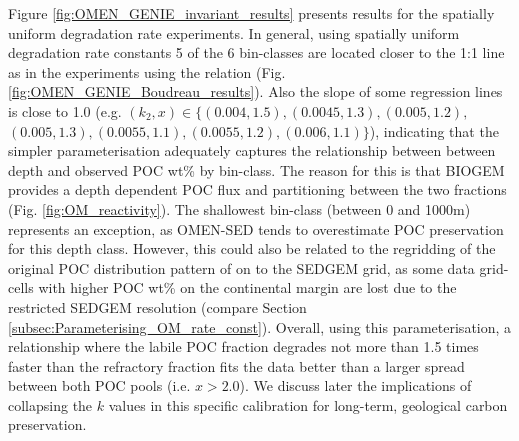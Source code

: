 \documentclass[gmd, manuscript]{copernicus}
\begin{document}
Figure \ref{fig:OMEN_GENIE_invariant_results} presents results for the spatially uniform degradation rate experiments. 
In general, using spatially uniform degradation rate constants 5 of the 6 bin-classes are located closer to the 1:1 line as in the experiments using the \citet{boudreau1997diagenetic} relation (Fig. \ref{fig:OMEN_GENIE_Boudreau_results}). 
Also the slope of some regression lines is close to 1.0 (e.g. $(k_2, x) \in \{ (0.004, 1.5),  (0.0045, 1.3), (0.005, 1.2), $ $ (0.005, 1.3), (0.0055, 1.1),(0.0055, 1.2), (0.006, 1.1)\}$), indicating that the simpler parameterisation adequately 
captures the relationship between between depth and observed POC wt\% by bin-class. The reason for this is that BIOGEM provides a depth dependent POC flux and partitioning between the two fractions (Fig. \ref{fig:OM_reactivity}). 
The shallowest bin-class (between 0 and 1000m) represents an exception, as OMEN-SED tends to overestimate POC preservation for this depth class. However, this could also be related to the regridding of the original POC distribution 
pattern of \citep{seiter_organic_2004} on to the SEDGEM grid, as some data grid-cells with higher POC wt\% on the continental margin are lost due to the restricted SEDGEM resolution (compare Section \ref{subsec:Parameterising_OM_rate_const}). 
Overall, using this parameterisation, a relationship where the labile POC fraction degrades not more than 1.5 times faster than the refractory fraction fits the 
\citet{seiter_organic_2004} data better than a larger spread between both POC pools (i.e. $x > 2.0$). 
We discuss later the implications of collapsing the $k$ values in this specific calibration for long-term, geological carbon preservation. 
\end{document}

